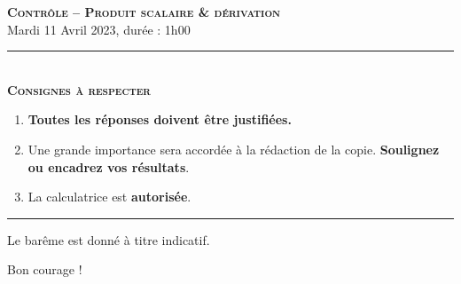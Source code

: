 \documentclass[11pt]{article}
\begin{document}

%

\begin{center}
\textbf{\LARGE \textsc{Contrôle -- Produit scalaire \& dérivation}}\\[2mm]

{\large Mardi 11 Avril 2023, durée : 1h00}\\[1mm]
\noindent\rule{8cm}{0.4pt}\\[1mm]
\textbf{\textsc{Consignes à respecter}}
\begin{enumerate}[label=\textbf{\arabic*/}]
\item \textbf{Toutes les réponses doivent être justifiées.}
\item Une grande importance sera accordée à la rédaction de la
  copie. \textbf{Soulignez ou encadrez vos résultats}.
\item La calculatrice est \textbf{autorisée}.
    \end{enumerate}
\noindent\rule{12cm}{0.4pt}
\end{center}

\vspace{2mm}
\noindent Le barême est donné à titre indicatif.
\vspace{2mm}
\begin{center}
  Bon courage !
\end{center}
\end{document}
